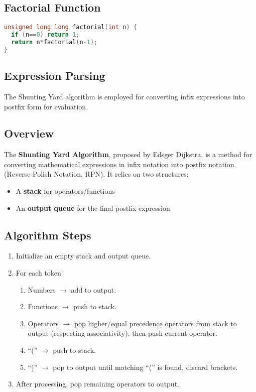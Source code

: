 \documentclass[conference]{IEEEtran}
\begin{document}
\subsection{Factorial Function}
\begin{lstlisting}[language=C, caption={C Implementation of Factorial Function}]
unsigned long long factorial(int n) {
  if (n==0) return 1;
  return n*factorial(n-1);
}
\end{lstlisting}

\subsection{Expression Parsing}

The Shunting Yard algorithm is employed for converting infix expressions into postfix form for evaluation.

\subsection{Overview}
The \textbf{Shunting Yard Algorithm}, proposed by Edsger Dijkstra, is a method for converting mathematical expressions in infix notation into postfix notation (Reverse Polish Notation, RPN).  
It relies on two structures:
\begin{itemize}
    \item A \textbf{stack} for operators/functions
    \item An \textbf{output queue} for the final postfix expression
\end{itemize}

\subsection{Algorithm Steps}
\begin{enumerate}
    \item Initialize an empty stack and output queue.
    \item For each token:
    \begin{enumerate}
        \item Numbers $\rightarrow$ add to output.
        \item Functions $\rightarrow$ push to stack.
        \item Operators $\rightarrow$ pop higher/equal precedence operators from stack to output (respecting associativity), then push current operator.
        \item ``('' $\rightarrow$ push to stack.
        \item ``)'' $\rightarrow$ pop to output until matching ``('' is found, discard brackets.
    \end{enumerate}
    \item After processing, pop remaining operators to output.
\end{enumerate}
\end{document}
